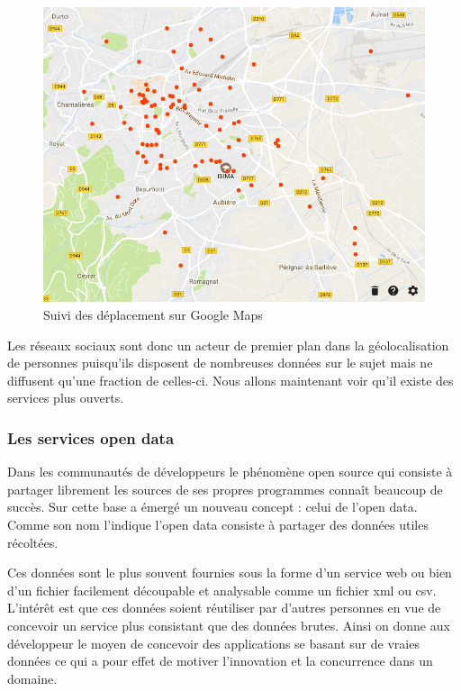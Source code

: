 \begin{figure}[H]
    \centering
    \includegraphics[width=\textwidth]{./img/googlemaps.png}
    \caption{Suivi des déplacement sur Google Maps}
    \label{google-maps}
\end{figure}

Les réseaux sociaux sont donc un acteur de premier plan dans la géolocalisation de personnes puisqu’ils disposent de nombreuses données sur le sujet mais ne diffusent qu’une fraction de celles-ci. Nous allons maintenant voir qu’il existe des services plus ouverts.

\subsubsection{Les services open data}

Dans les communautés de développeurs le phénomène open source qui consiste à partager librement les sources de ses propres programmes connaît beaucoup de succès. Sur cette base a émergé un nouveau concept : celui de l’open data. Comme son nom l’indique l’open data consiste à partager des données utiles récoltées.

Ces données sont le plus souvent fournies sous la forme d’un service web ou bien d’un fichier facilement découpable et analysable comme un fichier xml ou csv. L’intérêt est que ces données soient réutiliser par d’autres personnes en vue de concevoir un service plus consistant que des données brutes. Ainsi on donne aux développeur le moyen de concevoir des applications se basant sur de vraies données ce qui a pour effet de motiver l’innovation et la concurrence dans un domaine.

